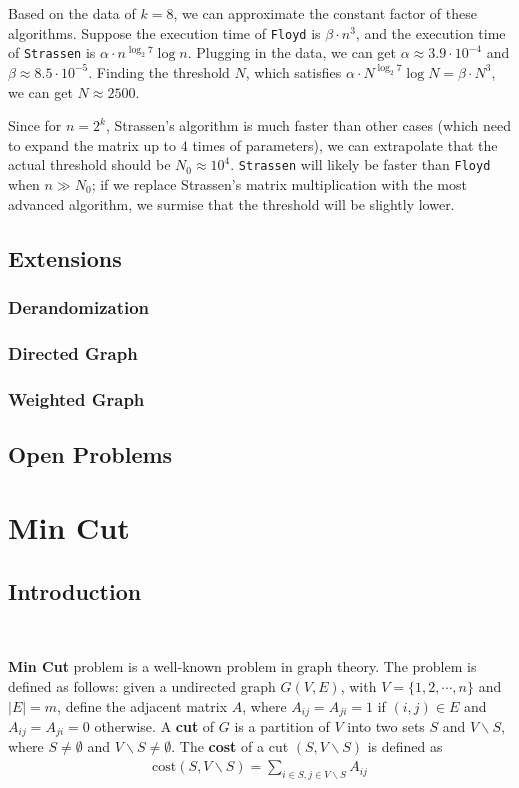 \documentclass[12pt]{article}
\begin{document}
Based on the data of $k=8$, we can approximate the constant factor of these algorithms. Suppose the execution time of \texttt{Floyd} is $\beta\cdot n^3$, and the execution time of \texttt{Strassen} is $\alpha\cdot n^{\log_2 7}\log n$. Plugging in the data, we can get $\alpha\approx 3.9\cdot 10^{-4}$ and $\beta\approx 8.5\cdot 10^{-5}$. Finding the threshold $N$, which satisfies $\alpha\cdot N^{\log_2 7}\log N=\beta\cdot N^3$, we can get $N\approx 2500$. 

Since for $n=2^k$, Strassen's algorithm is much faster than other cases (which need to expand the matrix up to $4$ times of parameters), we can extrapolate that the actual threshold should be $N_0\approx 10^4$. \texttt{Strassen} will likely be faster than \texttt{Floyd} when $n\gg N_0$; if we replace Strassen's matrix multiplication with the most advanced algorithm, we surmise that the threshold will be slightly lower.

\subsection{Extensions}

\subsubsection{Derandomization}
\subsubsection{Directed Graph}
\subsubsection{Weighted Graph}

\subsection{Open Problems}
\section{Min Cut}

\subsection{Introduction}\

\textbf{Min Cut} problem is a well-known problem in graph theory. The problem is defined as follows: given a  undirected graph $G(V,E)$, with $V=\{1,2,\cdots,n\}$ and $|E|=m$, define the adjacent matrix $A$, where $A_{ij}=A_{ji}=1$ if $(i,j)\in E$ and $A_{ij}=A_{ji}=0$ otherwise. A \textbf{cut} of $G$ is a partition of $V$ into two sets $S$ and $V\backslash S$, where $S\neq\emptyset$ and $V\backslash S\neq\emptyset$. The \textbf{cost} of a cut $(S,V\backslash S)$ is defined as
\begin{align*}
    \text{cost}(S,V\backslash S)=\sum_{i\in S, j\in V\backslash S}A_{ij}
\end{align*}
\end{document}
